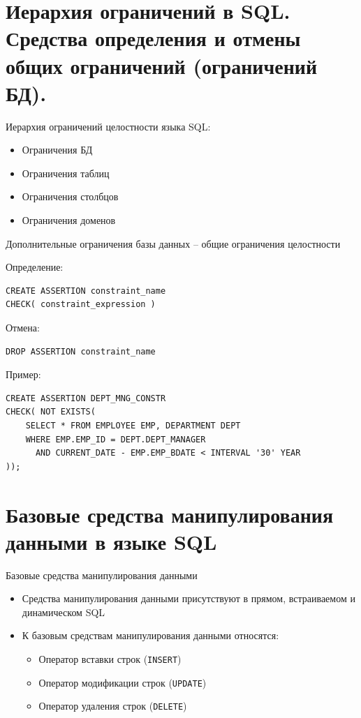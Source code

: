 \documentclass[a4paper,12pt]{article}
\begin{document}
\section{Иерархия ограничений в SQL. Средства определения и отмены общих ограничений (ограничений БД).}

Иерархия ограничений целостности языка SQL:
\begin{itemize}
    \item Ограничения БД
    \item Ограничения таблиц
    \item Ограничения столбцов
    \item Ограничения доменов
\end{itemize}

Дополнительные ограничения базы данных – общие ограничения целостности

Определение:
\begin{lstlisting}
CREATE ASSERTION constraint_name
CHECK( constraint_expression )
\end{lstlisting}

Отмена:
\begin{lstlisting}
DROP ASSERTION constraint_name
\end{lstlisting}

Пример:
\begin{lstlisting}
CREATE ASSERTION DEPT_MNG_CONSTR
CHECK( NOT EXISTS(
    SELECT * FROM EMPLOYEE EMP, DEPARTMENT DEPT
    WHERE EMP.EMP_ID = DEPT.DEPT_MANAGER
      AND CURRENT_DATE - EMP.EMP_BDATE < INTERVAL '30' YEAR
));
\end{lstlisting}

\section{Базовые средства манипулирования данными в языке SQL}

Базовые средства манипулирования данными  
\begin{itemize}
    \item Средства манипулирования данными присутствуют в прямом, встраиваемом и динамическом SQL
    \item К базовым средствам манипулирования данными относятся:
    \begin{itemize}
        \item Оператор вставки строк (\texttt{INSERT})
        \item Оператор модификации строк (\texttt{UPDATE})
        \item Оператор удаления строк (\texttt{DELETE})
    \end{itemize}
\end{itemize}
\end{document}
